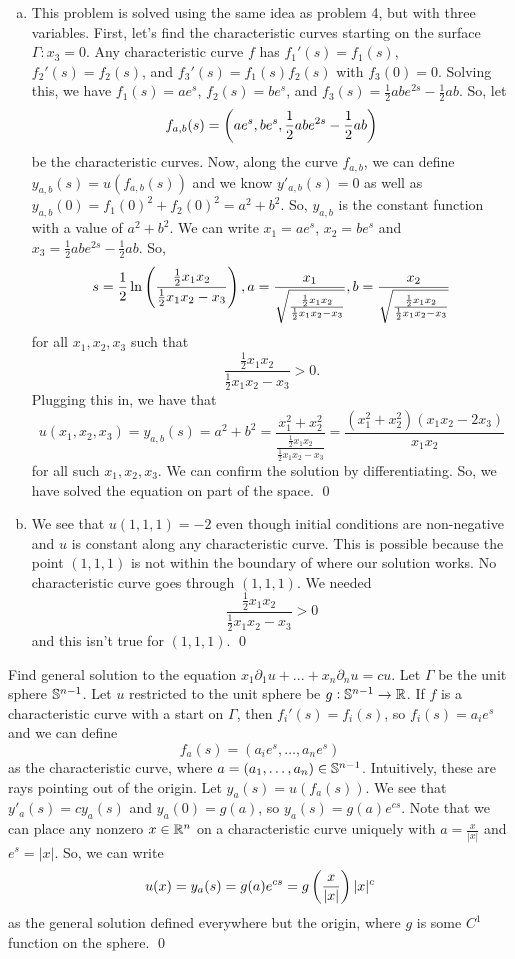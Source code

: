 \documentclass{article}
\renewcommand{\d}{\partial}
\begin{document}
\tri
\hop
\solution
\begin{enumerate}[(a)]
    \item This problem is solved using the same idea as problem 4, but with three variables. First, let's find the characteristic curves starting on the surface $\Gamma: x_3 = 0$. 
    Any characteristic curve $f$ has $f_1'(s) = f_1(s)$, $f_2'(s) = f_2(s)$, and $f_3'(s) = f_1(s)f_2(s)$ with $f_3(0) = 0$. 
    \hop 
    Solving this, we have $f_1(s) = ae^s$, $f_2(s)=be^s$, and $f_3(s)=\frac{1}{2}abe^{2s}-\frac{1}{2}ab$. So, let 
    \[f_{a,b}(s) = \del{ae^s, be^s,\frac{1}{2}abe^{2s}-\frac{1}{2}ab}\]
    be the characteristic curves. Now, along the curve $f_{a,b}$, we can define $y_{a,b}(s) = u(f_{a,b}(s))$ and we know $y'_{a,b}(s) = 0$ as well as $y_{a,b}(0) = f_1(0)^2 + f_2(0)^2 = a^2+b^2$. So, $y_{a,b}$ is the constant function with a value of $a^2 + b^2$. 
    \hop 
    We can write $x_1 = ae^s$, $x_2 = be^s$ and $x_3=\frac{1}{2}abe^{2s}-\frac{1}{2}ab$. So,
    \[s = \frac{1}{2}\ln\del{\frac{\frac{1}{2}x_1x_2}{\frac{1}{2}x_1x_2-x_3}}, a = \frac{x_1}{\sqrt{\frac{\frac{1}{2}x_1x_2}{\frac{1}{2}x_1x_2-x_3}}}, b = \frac{x_2}{\sqrt{\frac{\frac{1}{2}x_1x_2}{\frac{1}{2}x_1x_2-x_3}}}\]
    for all $x_1,x_2,x_3$ such that 
    \[\frac{\frac{1}{2}x_1x_2}{\frac{1}{2}x_1x_2-x_3} > 0.\]
    Plugging this in, we have that 
    \[u(x_1, x_2, x_3) = y_{a,b}(s)=a^2+b^2 = \frac{x_1^2 + x_2^2}{\frac{\frac{1}{2}x_1x_2}{\frac{1}{2}x_1x_2-x_3}} = \frac{(x_1^2+x_2^2)(x_1x_2-2x_3)}{x_1x_2}\]
    for all such $x_1, x_2,x_3$. We can confirm the solution by differentiating. So, we have solved the equation on part of the space. \qed
    \item We see that $u(1,1,1) = -2$ even though initial conditions are non-negative and $u$ is constant along any characteristic curve. This is possible because the point $(1,1,1)$ is not within the boundary of where our solution works. No characteristic curve goes through $(1,1,1)$. We needed
    \[\frac{\frac{1}{2}x_1x_2}{\frac{1}{2}x_1x_2-x_3} > 0\]
    and this isn't true for $(1,1,1)$. \qed
\end{enumerate}

\newpage
{} Find general solution to the equation $x_1\d_1u + ... + x_n\d_nu = cu$. \tri
\hop
\solution Let $\Gamma$ be the unit sphere $\mathbb{S}^{n-1}$. Let $u$ restricted to the unit sphere be $g: \mathbb{S}^{n-1} \to \mathbb{R}$. If $f$ is a characteristic curve with a start on $\Gamma$, then $f_i'(s) = f_i(s)$, so $f_i(s) = a_ie^s$ and we can define
\[f_a(s)=(a_ie^s, \dots, a_ne^s)\]
as the characteristic curve, where $a = (a_1, \dots, a_n) \in \mathbb{S}^{n-1}$. Intuitively, these are rays pointing out of the origin. Let $y_a(s)=u(f_a(s))$. We see that $y'_a(s) = cy_a(s)$ and $y_a(0) = g(a)$, so $y_a(s) = g(a)e^{cs}$. 
\hop
Note that we can place any nonzero $x \in \mathbb{R}^n$ on a characteristic curve uniquely with $a = \frac{x}{|x|}$ and $e^s = |x|$. So, we can write 
\[u(x) = y_a(s) = g(a)e^{cs} = g\del{\frac{x}{|x|}}|x|^c\]
as the general solution defined everywhere but the origin, where $g$ is some $C^1$ function on the sphere. \qed
\end{document}
